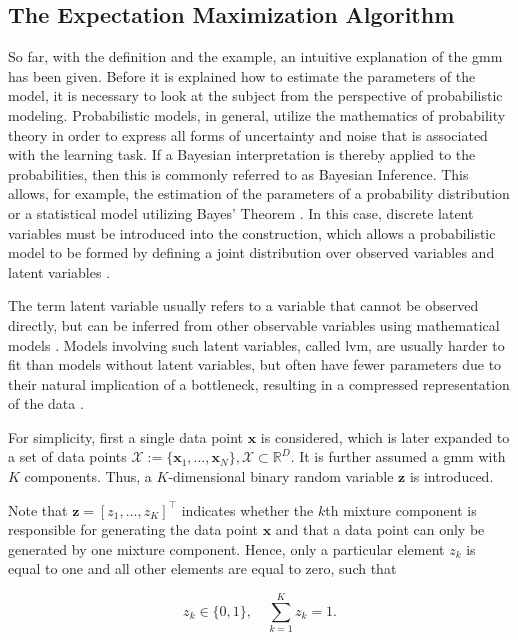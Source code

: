 \documentclass[../../../main.tex]{subfiles}
\begin{document}
\subsection{The Expectation Maximization Algorithm} \label{subsec:em_algorithm}
So far, with the definition and the example, an intuitive explanation of the \gls{gmm} has been given. Before it is explained how to estimate the parameters of the model, it is necessary to look at the subject from the perspective of probabilistic modeling. Probabilistic models, in general, utilize the mathematics of probability theory in order to express all forms of uncertainty and noise that is associated with the learning task. If a Bayesian interpretation is thereby applied to the probabilities, then this is commonly referred to as Bayesian Inference. This allows, for example, the estimation of the parameters of a probability distribution or a statistical model utilizing Bayes' Theorem \cite[p.245]{dei_2020}. In this case, discrete latent variables must be introduced into the construction, which allows a probabilistic model to be formed by defining a joint distribution over observed variables and latent variables \cite[432]{bis_2006}. 

The term latent variable usually refers to a variable that cannot be observed directly, but can be inferred from other observable variables using mathematical models \cite{bor_2003}. Models involving such latent variables, called \gls{lvm}, are usually harder to fit than models without latent variables, but often have fewer parameters due to their natural implication of a bottleneck, resulting in a compressed representation of the data \cite[337]{mur_2012}. 

For simplicity, first a single data point $\bm{x}$ is considered, which is later expanded to a set of data points $\mathcal{X}:=\{\bm{x}_1, \dots, \bm{x}_N\}, \mathcal{X} \subset \mathbb{R}^D$. It is further assumed a \acrshort{gmm} with $K$ components. Thus, a $K$-dimensional binary random variable $\bm{z}$ is introduced.

Note that $\bm{z} = [z_1, \dots, z_K]^\top$ indicates whether the $k$th mixture component is responsible for generating the data point $\bm{x}$ and that a data point can only be generated by one mixture component. Hence, only a particular element $z_k$ is equal to one and all other elements are equal to zero, such that

\begin{equation}
    z_k \in \{0,1\}, \quad \sum\limits^K_{k=1} z_k=1.
\end{equation}
\end{document}
